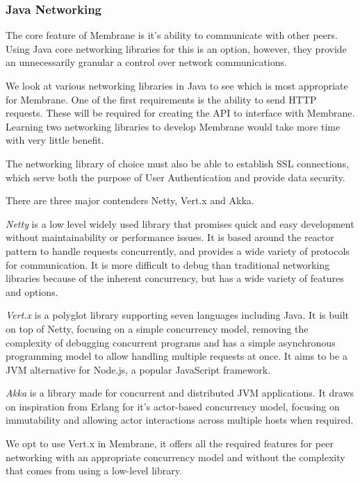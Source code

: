\documentclass[11pt, a4paper, twocolumn, twoside]{report}
\begin{document}
\subsubsection{Java Networking}

The core feature of Membrane is it's ability to communicate with other peers. Using Java core networking libraries for this is an option, however, they provide an unnecessarily  granular a control over network communications.

We look at various networking libraries in Java to see which is most appropriate for Membrane. One of the first requirements is the ability to send HTTP requests. These will be required for creating the API to interface with Membrane. Learning two networking libraries to develop Membrane would take more time with very little benefit.

The networking library of choice must also be able to establish SSL connections, which serve both the purpose of User Authentication and provide data security.

There are three major contenders Netty, Vert.x and Akka.

\emph{Netty} is a low level widely used library that promises quick and easy development without maintainability or performance issues. \citep{netty2017site} It is based around the reactor pattern to handle requests concurrently, and provides a wide variety of protocols for communication. It is more difficult to debug than traditional networking libraries because of the inherent concurrency, but has a wide variety of features and options.

\emph{Vert.x} is a polyglot library supporting seven languages including Java. It is built on top of Netty, focusing on a simple concurrency model, removing the complexity of debugging concurrent programs and has a simple asynchronous programming model to allow handling multiple requests at once. It aims to be a JVM alternative for Node.js, a popular JavaScript framework. \citep{vertx2017site}

\emph{Akka} is a library made for concurrent and distributed JVM applications. It draws on inspiration from Erlang for it's actor-based concurrency model, focusing on immutability and allowing actor interactions across multiple hosts when required. \citep{gupta2012akka}

We opt to use Vert.x in Membrane, it offers all the required features for peer networking with an appropriate concurrency model and without the complexity that comes from using a low-level library.
\end{document}
